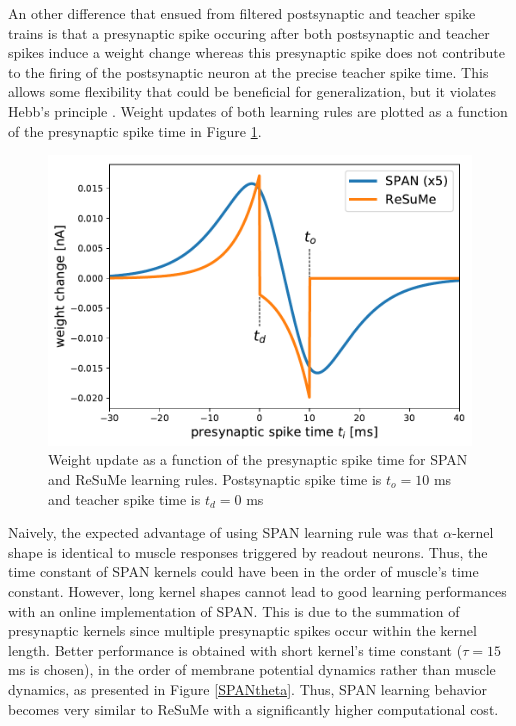 \documentclass[11pt, a4paper]{article} %
\begin{document}
An other difference that ensued from filtered postsynaptic and teacher spike trains is that a presynaptic spike occuring after both postsynaptic and teacher spikes induce a weight change whereas this presynaptic spike does not contribute to the firing of the postsynaptic neuron at the precise teacher spike time. This allows some flexibility that could be beneficial for generalization, but it violates Hebb's principle \cite{hebb1949organization}. Weight updates of both learning rules are plotted as a function of the presynaptic spike time in Figure \ref{dw}.

\begin{figure}
\centering
\includegraphics[scale=.7]{figures/weight_update.pdf}
\caption{Weight update as a function of the presynaptic spike time for SPAN and ReSuMe learning rules. Postsynaptic spike time is $t_o = 10$ ms and teacher spike time is $t_d = 0$ ms}
\label{dw}
\end{figure}

Naively, the expected advantage of using SPAN learning rule was that $\alpha$-kernel shape is identical to muscle responses triggered by readout neurons. Thus, the time constant of SPAN kernels could have been in the order of muscle's time constant. However, long kernel shapes cannot lead to good learning performances with an online implementation of SPAN. This is due to the summation of presynaptic kernels since multiple presynaptic spikes occur within the kernel length. Better performance is obtained with short kernel's time constant ($\tau = 15$ ms is chosen), in the order of membrane potential dynamics rather than muscle dynamics, as presented in Figure \ref{SPANtheta}. Thus, SPAN learning behavior becomes very similar to ReSuMe with a significantly higher computational cost.
\end{document}
